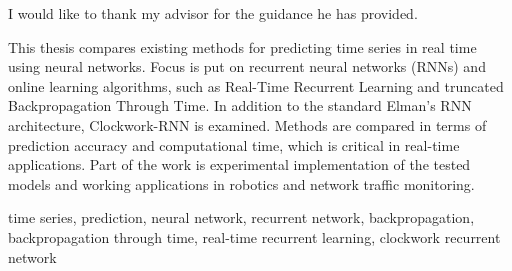 \documentclass[12pt,oneside]{fithesis2}
\begin{document}
  \FrontMatter                    %
    \ThesisTitlePage                %
    \begin{ThesisDeclaration}       %
      \DeclarationText
      \AdvisorName
    \end{ThesisDeclaration}
    \begin{ThesisThanks}            %
      I would like to thank my advisor for the guidance he has provided. %
    \end{ThesisThanks}
    \begin{ThesisAbstract}          %
      This thesis compares existing methods for predicting time series in real time using neural networks. Focus is put on recurrent neural networks (RNNs) and online learning algorithms, such as Real-Time Recurrent Learning and truncated Backpropagation Through Time. In addition to the standard Elman's RNN architecture, \mbox{Clockwork-RNN} is examined. Methods are compared in terms of prediction accuracy and computational time, which is critical in real-time applications. Part of the work is experimental implementation of the tested models and working applications in robotics and  network traffic monitoring.
    \end{ThesisAbstract}
    \begin{ThesisKeyWords}          %
	time series, prediction, neural network, recurrent network, backpropagation, backpropagation through time, real-time recurrent learning, clockwork recurrent network
    \end{ThesisKeyWords}
    \tableofcontents                %
   \listoftables                   %
   \listoffigures                  %
   
  
  \MainMatter
\end{document}
